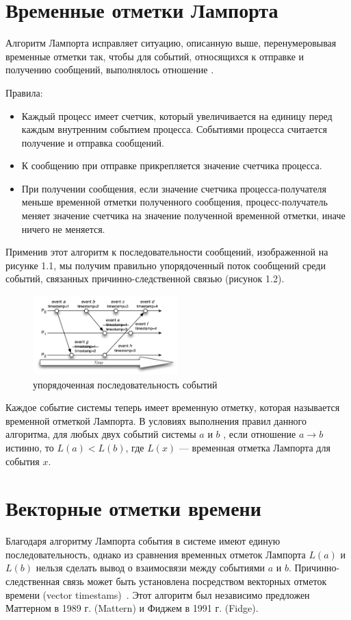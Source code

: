 \section{Временные отметки Лампорта}
Алгоритм Лампорта исправляет ситуацию, описанную выше, перенумеровывая временные отметки так, чтобы для событий, относящихся к отправке и получению сообщений, выполнялось отношение .

Правила:
\begin{itemize}
\item Каждый процесс имеет счетчик, который увеличивается на единицу  перед каждым внутренним событием процесса. Событиями процесса считается получение и отправка сообщений. 
\item К сообщению при отправке прикрепляется значение счетчика процесса.
\item При получении сообщения, если значение счетчика процесса-получателя меньше временной отметки полученного сообщения, процесс-получатель меняет значение счетчика на значение полученной временной отметки, иначе ничего не меняется. 
\end{itemize}
Применив этот алгоритм к последовательности сообщений, изображенной на рисунке 1.1, мы получим правильно упорядоченный поток сообщений среди событий, связанных 
причинно-следственной связью (рисунок 1.2). 
\begin{figure}
\centering
\includegraphics[width=0.5\textwidth]{img/lamport2.png}
\caption{упорядоченная последовательность событий}
\end{figure}
Каждое событие системы теперь имеет временную отметку, которая называется временной отметкой Лампорта. В условиях выполнения правил данного алгоритма, для любых двух событий системы $a$ и $b$ , если отношение $a \rightarrow b$ истинно, то $L(a) < L(b)$, где $L(x)$ --- временная отметка Лампорта для события $x$. 

\section{Векторные отметки времени} 
Благодаря алгоритму Лампорта события в системе имеют единую последовательность, однако из сравнения временных отметок Лампорта $L(a)$ и $L(b)$  нельзя сделать вывод о взаимосвязи между событиями $a$ и $b$. Причинно-следственная связь может быть установлена посредством векторных
отметок времени (vector timestams)~\cite{tanenbaum}. Этот алгоритм был независимо предложен Маттерном в 1989 г. (Mattern) и Фиджем в 1991 г. (Fidge).

